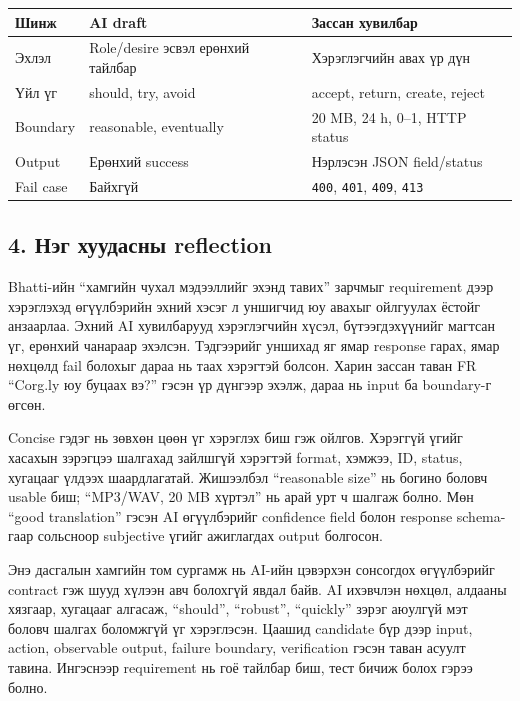 \documentclass[
  mongolian,
]{article}
\begin{document}
\begin{longtable}[]{@{}lll@{}}
\toprule\noalign{}
Шинж & AI draft & Зассан хувилбар \\
\midrule\noalign{}
\endhead
\bottomrule\noalign{}
\endlastfoot
Эхлэл & Role/desire эсвэл ерөнхий тайлбар & Хэрэглэгчийн авах үр дүн \\
Үйл үг & should, try, avoid & accept, return, create, reject \\
Boundary & reasonable, eventually & 20 MB, 24 h, 0--1, HTTP status \\
Output & Ерөнхий success & Нэрлэсэн JSON field/status \\
Fail case & Байхгүй & \texttt{400}, \texttt{401}, \texttt{409},
\texttt{413} \\
\end{longtable}

\newpage

\subsection{4. Нэг хуудасны
reflection}\label{ux43dux44dux433-ux445ux443ux443ux434ux430ux441ux43dux44b-reflection}

Bhatti-ийн ``хамгийн чухал мэдээллийг эхэнд тавих'' зарчмыг requirement
дээр хэрэглэхэд өгүүлбэрийн эхний хэсэг л уншигчид юу авахыг ойлгуулах
ёстойг анзаарлаа. Эхний AI хувилбарууд хэрэглэгчийн хүсэл,
бүтээгдэхүүнийг магтсан үг, ерөнхий чанараар эхэлсэн. Тэдгээрийг уншихад
яг ямар response гарах, ямар нөхцөлд fail болохыг дараа нь таах хэрэгтэй
болсон. Харин зассан таван FR ``Corg.ly юу буцаах вэ?'' гэсэн үр дүнгээр
эхэлж, дараа нь input ба boundary-г өгсөн.

Concise гэдэг нь зөвхөн цөөн үг хэрэглэх биш гэж ойлгов. Хэрэггүй үгийг
хасахын зэрэгцээ шалгахад зайлшгүй хэрэгтэй format, хэмжээ, ID, status,
хугацааг үлдээх шаардлагатай. Жишээлбэл ``reasonable size'' нь богино
боловч usable биш; ``MP3/WAV, 20 MB хүртэл'' нь арай урт ч шалгаж болно.
Мөн ``good translation'' гэсэн AI өгүүлбэрийг confidence field болон
response schema-гаар сольсноор subjective үгийг ажиглагдах output
болгосон.

Энэ дасгалын хамгийн том сургамж нь AI-ийн цэвэрхэн сонсогдох
өгүүлбэрийг contract гэж шууд хүлээн авч болохгүй явдал байв. AI
ихэвчлэн нөхцөл, алдааны хязгаар, хугацааг алгасаж, ``should'',
``robust'', ``quickly'' зэрэг аюулгүй мэт боловч шалгах боломжгүй үг
хэрэглэсэн. Цаашид candidate бүр дээр input, action, observable output,
failure boundary, verification гэсэн таван асуулт тавина. Ингэснээр
requirement нь гоё тайлбар биш, тест бичиж болох гэрээ болно.
\end{document}
